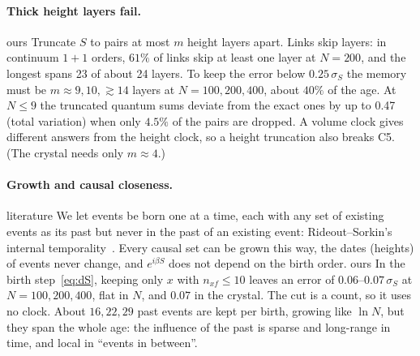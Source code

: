 \documentclass[11pt,a4paper]{article}
\newcommand{\tagbox}[2]{\textsf{\scriptsize\colorbox{#1!12}{\textcolor{#1!70!black}{#2}}}}
\newcommand{\lit}{\tagbox{blue}{literature}}
\newcommand{\ours}{\tagbox{orange}{ours}}
\begin{document}
\paragraph{Thick height layers fail.} \ours{} Truncate $S$ to pairs at most $m$ height layers apart. Links skip layers: in continuum $1+1$ orders, $61\%$ of links skip at least one layer at $N=200$, and the longest spans 23 of about 24 layers. To keep the error below $0.25\,\sigma_S$ the memory must be $m\approx9,10,\gtrsim14$ layers at $N=100,200,400$, about $40\%$ of the age. At $N\le9$ the truncated quantum sums deviate from the exact ones by up to 0.47 (total variation) when only $4.5\%$ of the pairs are dropped. A volume clock gives different answers from the height clock, so a height truncation also breaks C5. (The crystal needs only $m\approx4$.)

\paragraph{Growth and causal closeness.} \lit{} We let events be born one at a time, each with any set of existing events as its past but never in the past of an existing event: Rideout--Sorkin's internal temporality~\cite{RideoutSorkin00}. Every causal set can be grown this way, the dates (heights) of events never change, and $e^{i\beta S}$ does not depend on the birth order. \ours{} In the birth step~\eqref{eq:dS}, keeping only $x$ with $n_{xf}\le10$ leaves an error of $0.06$--$0.07\,\sigma_S$ at $N=100,200,400$, flat in $N$, and $0.07$ in the crystal. The cut is a count, so it uses no clock. About $16,22,29$ past events are kept per birth, growing like $\ln N$, but they span the whole age: the influence of the past is sparse and long-range in time, and local in ``events in between''.
\end{document}
